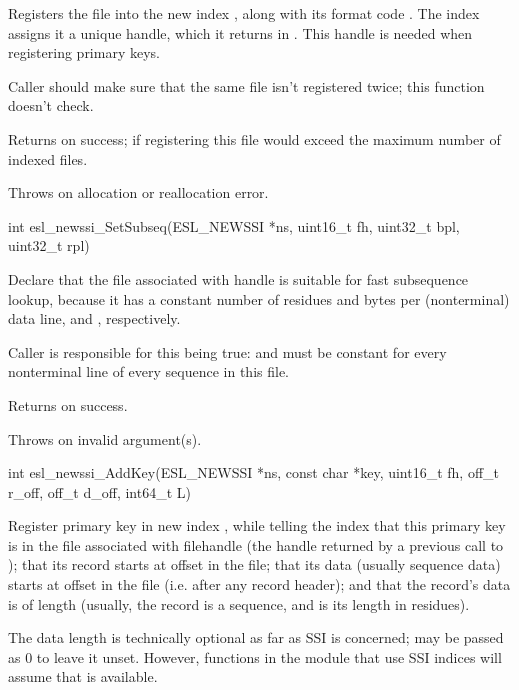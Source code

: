 \begin{sreapi}
Registers the file  into the new index ,
along with its format code . The index assigns it
a unique handle, which it returns in . This
handle is needed when registering primary keys.

Caller should make sure that the same file isn't registered
twice; this function doesn't check.

Returns  on success;
 if registering this file would exceed the
maximum number of indexed files.

Throws  on allocation or reallocation error.


\hypertarget{func:esl_newssi_SetSubseq()}
{\item[int esl\_newssi\_SetSubseq(ESL\_NEWSSI *ns, uint16\_t fh, uint32\_t bpl, uint32\_t rpl)]}

Declare that the file associated with handle  is
suitable for fast subsequence lookup, because it has
a constant number of residues and bytes per (nonterminal)
data line,  and , respectively.

Caller is responsible for this being true:  and
 must be constant for every nonterminal line of 
every sequence in this file.

Returns  on success.

Throws  on invalid argument(s).


\hypertarget{func:esl_newssi_AddKey()}
{\item[int esl\_newssi\_AddKey(ESL\_NEWSSI *ns, const char *key, uint16\_t fh, 
		  off\_t r\_off, off\_t d\_off, int64\_t L)]}

Register primary key  in new index , while telling
the index that this primary key is in the file associated
with filehandle  (the handle returned by a previous call
to ); that its record starts at 
offset  in the file; that its data (usually
sequence data) starts at offset  in the file (i.e.
after any record header); and that the record's data is
of length  (usually, the record is a sequence, and  
is its length in residues).

The data length  is technically optional as far as SSI
is concerned;  may be passed as 0 to leave it
unset. However, functions in the  module that use
SSI indices will assume that  is available.


\end{sreapi}
